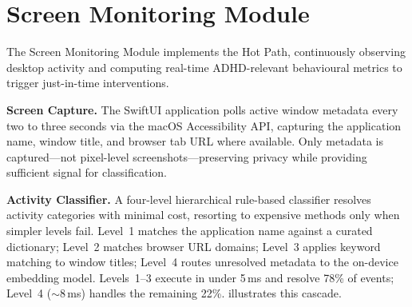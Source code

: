 \section{Screen Monitoring Module}
\label{sec:screen_monitoring}

The Screen Monitoring Module implements the Hot Path, continuously observing desktop activity and computing real-time ADHD-relevant behavioural metrics to trigger just-in-time interventions.

\textbf{Screen Capture.} The SwiftUI application polls active window metadata every two to three seconds via the macOS Accessibility API, capturing the application name, window title, and browser tab URL where available. Only metadata is captured---not pixel-level screenshots---preserving privacy while providing sufficient signal for classification.

\textbf{Activity Classifier.} A four-level hierarchical rule-based classifier resolves activity categories with minimal cost, resorting to expensive methods only when simpler levels fail. Level~1 matches the application name against a curated dictionary; Level~2 matches browser URL domains; Level~3 applies keyword matching to window titles; Level~4 routes unresolved metadata to the on-device embedding model. Levels~1--3 execute in under 5\,ms and resolve 78\% of events; Level~4 ($\sim$8\,ms) handles the remaining 22\%.  illustrates this cascade.


